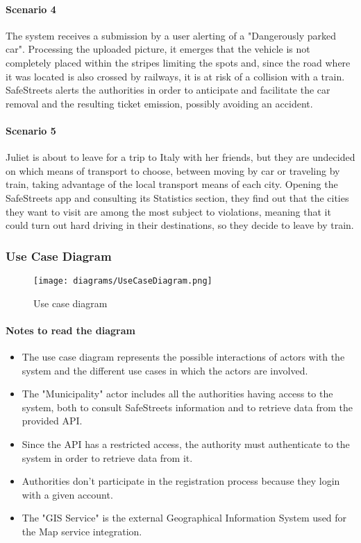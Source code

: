 \paragraph{Scenario 4}
\label{scenario:4}
	The system receives a submission by a user alerting of a "Dangerously parked car". Processing the uploaded picture, it emerges that the vehicle is not completely placed within the stripes limiting the spots and, since the road where it was located is also crossed by railways, it is at risk of a collision with a train. SafeStreets alerts the authorities in order to anticipate and facilitate the car removal and the resulting ticket emission, possibly avoiding an accident.	
	
\paragraph{Scenario 5}
\label{scenario:5}
	Juliet is about to leave for a trip to Italy with her friends, but they are undecided on which means of transport to choose, between moving by car or traveling by train, taking advantage of the local transport means of each city. Opening the SafeStreets app and consulting its Statistics section, they find out that the cities they want to visit are among the most subject to violations, meaning that it could turn out hard driving in their destinations, so they decide to leave by train.
	
\clearpage

\subsubsection{Use Case Diagram}
	\begin{figure}[h!]
		\centering
		\texttt{[image: diagrams/UseCaseDiagram.png]}
		\caption{
			\label{fig:useCase} 
				Use case diagram
		}
	\end{figure}
	
	\paragraph{Notes to read the diagram}
	\begin{itemize}
		\item The use case diagram represents the possible interactions of actors with the system and the different use cases in which the actors are involved.

		\item The "Municipality" actor includes all the authorities having access to the system, both to consult SafeStreets information and to retrieve data from the provided API.
		
		\item Since the API has a restricted access, the authority must authenticate to the system in order to retrieve data from it.
		
		\item Authorities don't participate in the registration process because they login with a given account.
		
		\item The "GIS Service" is the external Geographical Information System used for the Map service integration.
	\end{itemize}
		

